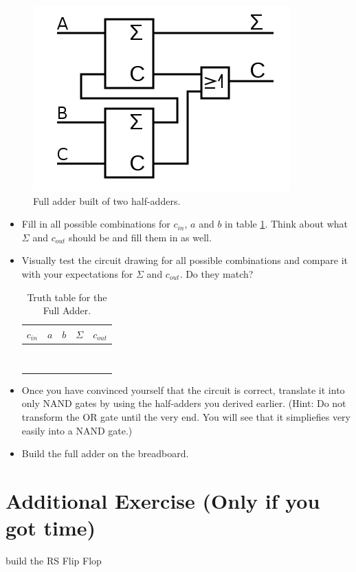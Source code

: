 \documentclass[10pt,a4paper]{article}
\begin{document}
\begin{figure}[h]
	\centering		  
	\includegraphics[scale=0.3]{full_adder.png}
	\caption{Full adder built of two half-adders.}
	\label{fig:full-adder}
\end{figure}
\begin{itemize}
	\item Fill in all possible combinations for $c_{in}$, $a$ and $b$ in table \ref{tab:full-adder-truth-table}. Think about what $\Sigma$ and $c_{out}$ should be and fill them in as well.
	\item Visually test the circuit drawing for all possible combinations and compare it with your expectations for $\Sigma$ and $c_{out}$. Do they match?
	
	\begin{table}[h]
		\centering
		\begin{tabular}{|c|c|c||c|c|}
			\hline
			$c_{in}$ & $a$ & $b$ & $\Sigma$ & $c_{out}$ \\ \hline
			&     &     &          &           \\ \hline
			&     &     &          &           \\ \hline
			&     &     &          &           \\ \hline
			&     &     &          &           \\ \hline
			&     &     &          &           \\ \hline
			&     &     &          &           \\ \hline
			&     &     &          &           \\ \hline
			&     &     &          &           \\ \hline
		\end{tabular}
		\caption{Truth table for the Full Adder.}
		\label{tab:full-adder-truth-table}
	\end{table}
	
	\item Once you have convinced yourself that the circuit is correct, translate it into only NAND gates by using the half-adders you derived earlier. (Hint: Do not transform the OR gate until the very end. You will see that it simpliefies very easily into a NAND gate.)
	\item Build the full adder on the breadboard.
\end{itemize}

\section{Additional Exercise (Only if you got time)}
build the RS Flip Flop

\newpage



%
\end{document}

